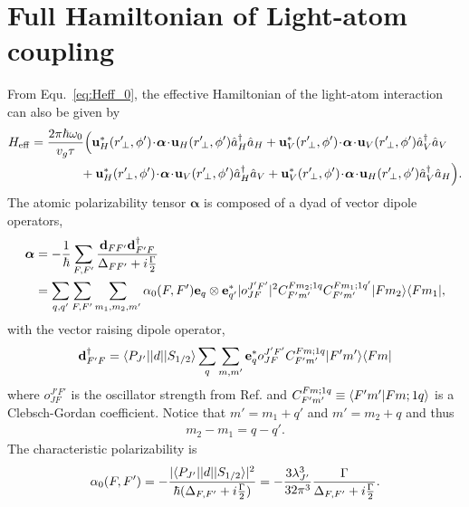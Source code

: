 \documentclass[preprint,aps,pra,onecolumn]{revtex4-1} %
\renewcommand{\tensor}[1]{\boldsymbol{#1}}
\begin{document}
\section{Full Hamiltonian of Light-atom coupling}
From Equ.~\eqref{eq:Heff_0}, the effective Hamiltonian of the light-atom interaction can also be given by
\begin{align}  
	H_{\rm eff}   = \frac{2\pi \hbar \omega_0}{ v_g \tau} &\Big( \mathbf{u}^*_H(r^\prime\!_\perp, \phi') 
	\!\cdot\! 
	\tensor{\alpha} \!\cdot\! \mathbf{u}_{H}(r^\prime\!_\perp, \phi') \hat{a}\dg_H \hat{a}_H +  
	\mathbf{u}^*_V(r^\prime\!_\perp, \phi')\! \cdot\! 
	\tensor{\alpha} \!\cdot\! \mathbf{u}_{V}(r^\prime\!_\perp, \phi') \hat{a}\dg_V \hat{a}_V \nonumber\\
	&\!\! + \mathbf{u}^*_H(r^\prime\!_\perp, \phi')\! \cdot\! \tensor{\alpha}\! \cdot\! 
	\mathbf{u}_{V}(r^\prime\!_\perp, \phi') \hat{a}\dg_H \hat{a}_V 
	+ \mathbf{u}^*_V(r^\prime\!_\perp, \phi') \!\cdot\! \tensor{\alpha}\! \cdot\! 
	\mathbf{u}_{H}(r^\prime\!_\perp, 
	\phi') \hat{a}\dg_V \hat{a}_H 
	\Big).  \label{eq:LightShiftHam_CG}
\end{align}
The atomic polarizability tensor $\tensor{\alpha}$ is composed of a dyad of vector dipole operators,    
\begin{align}
	\tensor{\alpha} & =  - \frac{1}{\hbar}  \sum_{F,F'} \frac{ \mathbf{d}_{FF'} \mathbf{d}^\dagger_{F'F} 
	}{\Delta_{FF'}+i\frac{\Gamma}{2} } \\
		& = \sum_{q,q'}  \sum_{F,F'} \sum_{m_1, m_2, m'} \alpha_0(F,F') \mathbf{e}_q \otimes 
		\mathbf{e}^*_{q'} | o^{J'F'}_{JF} |^2 C^{Fm_2;1q}_{F'm'} C^{Fm_1;1q'}_{F'm'} \op{F m_2}{F m_1},
\end{align}
with the vector raising  dipole operator,
\begin{align}
	\mathbf{d}^\dagger_{F'F} =  \langle{P_{J'}}\rvert| d |\lvert{S_{1/2}}\rangle \sum_q \sum_{m,m'} \mathbf{e}_q^* 
	o^{J'F'}_{JF} C^{Fm;1q}_{F'm'} \lvert{F'm'}\rangle\langle{Fm}\rvert
\end{align}
where $o^{J'F'}_{JF}$ is the oscillator strength from Ref. \cite{Deutsch2010a} and $C^{Fm;1q}_{F'm'} 
\equiv 
\langle{F'm'}|{Fm;1q}\rangle$ is a Clebsch-Gordan coefficient. 
Notice that $m' = m_1 + q'$ and $m' = m_2 + q$ and thus
\begin{align}
	m_2 - m_1 = q-q'.
\end{align}
The characteristic polarizability is
\begin{align} \label{eq:CharacteristicPolarizability}
	\alpha_0(F,F') = - \frac{ |\langle{P_{J'}}\rvert| d |\lvert{S_{1/2}}\rangle|^2 }{\hbar (\Delta_{F,F'}+i\frac{\Gamma}{2})} = - 
	\frac{3 
	\lambda_{J'}^3}{32 \pi^3} \frac{\Gamma}{\Delta_{F,F'}+i\frac{\Gamma}{2}}.
\end{align}
\end{document}
